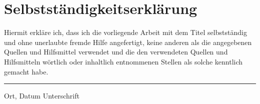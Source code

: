 


\newpage

\section{Selbstständigkeitserklärung}

Hiermit erkläre ich, dass ich die vorliegende Arbeit mit dem Titel  selbstständig und ohne unerlaubte fremde Hilfe angefertigt, keine anderen als die angegebenen Quellen und Hilfsmittel verwendet und die den verwendeten Quellen und Hilfsmitteln wörtlich oder inhaltlich entnommenen Stellen als solche kenntlich gemacht habe.
\vspace{4em}

\hrule width25em
\vspace{0.5em}
Ort, Datum\hspace{11.5em} Unterschrift
